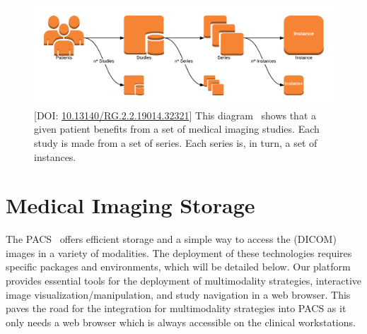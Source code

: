 
\begin{figure}[ht]
\centering
\includegraphics[width=\textwidth]{images/fig025}
\caption{[DOI: \href{https://doi.org/10.13140/RG.2.2.19014.32321}{10.13140/RG.2.2.19014.32321}] This diagram~\cite{calisto2019mips} shows that a given patient benefits from a set of medical imaging studies. Each study is made from a set of series. Each series is, in turn, a set of instances.}
\label{fig:fig025}
\end{figure}

\section{Medical Imaging Storage}
\label{sec:chap002008}

The \ac{PACS}~\cite{carter2018digital} offers efficient storage and a simple way to access the (\ac{DICOM}) images in a variety of modalities.
The deployment of these technologies requires specific packages and environments, which will be detailed below.
Our platform provides essential tools for the deployment of multimodality strategies, interactive image visualization/manipulation, and study navigation in a web browser.
This paves the road for the integration for multimodality strategies into \ac{PACS} as it only needs a web browser which is always accessible on the clinical workstations.